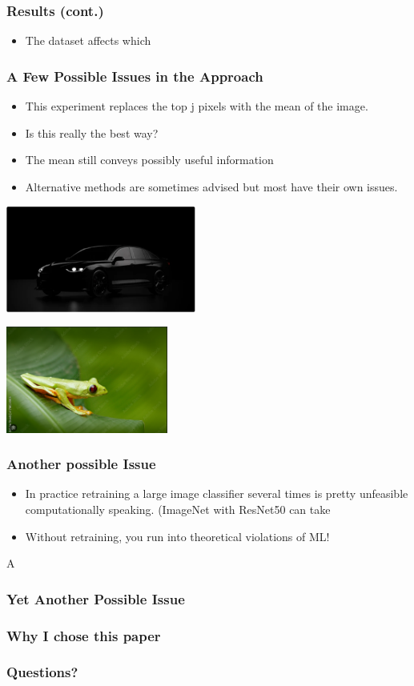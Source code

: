 \documentclass{beamer}
\theoremstyle{mystyle}
\begin{document}
\begin{frame}
	\frametitle{Results (cont.)}
	\begin{itemize}
	\item The dataset affects which 
	\end{itemize}
\end{frame}
\begin{frame}
    \frametitle{A Few Possible Issues in the Approach}
    \begin{itemize}
        \item This experiment replaces the top j pixels with the mean of the image.
        \item Is this really the best way?
        \item The mean still conveys possibly useful information
        \item Alternative methods are sometimes advised but most have their own issues.
    \end{itemize}
    \begin{minipage}{0.48\textwidth}
        \centering
        \includegraphics[width=\textwidth, height=3.5cm]{black_car.png}
    \end{minipage}
    \hfill
    \begin{minipage}{0.48\textwidth}
        \centering
        \includegraphics[width=\textwidth, height=3.5cm]{green_frog.png}
    \end{minipage}
\end{frame}
\begin{frame}
	\frametitle{Another possible Issue}
	\begin{itemize}
	\item In practice retraining a large image classifier several times is pretty unfeasible computationally speaking.  (ImageNet with ResNet50 can take 
	\item Without retraining, you run into theoretical violations of ML!
	\end{itemize}
\end{frame}A
\begin{frame}
	\frametitle{Yet Another Possible Issue}

\end{frame}
\begin{frame}
	\frametitle{Why I chose this paper}
\end{frame}
\begin{frame}
	\frametitle{Questions?}
\end{frame}
\end{document}
